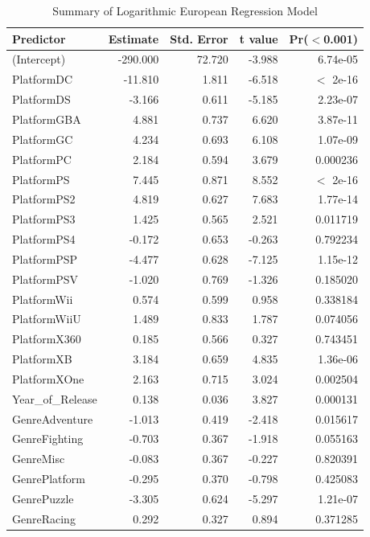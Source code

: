\documentclass[12pt]{article}
\begin{document}
\begin{table}[ht]
  \caption{Summary of Logarithmic European Regression Model}
  \label{tab:LogEU}
  \centering
  \begin{tabular}{lrrrr}
    \hline
    Predictor & Estimate & Std. Error & t value & Pr($<$0.001) \\
    \hline
    (Intercept) & -290.000 & 72.720 & -3.988 & 6.74e-05 \\
    PlatformDC & -11.810 & 1.811 & -6.518 & $<$ 2e-16 \\
    PlatformDS & -3.166 & 0.611 & -5.185 & 2.23e-07 \\
    PlatformGBA & 4.881 & 0.737 & 6.620 & 3.87e-11 \\
    PlatformGC & 4.234 & 0.693 & 6.108 & 1.07e-09 \\
    PlatformPC & 2.184 & 0.594 & 3.679 & 0.000236 \\
    PlatformPS & 7.445 & 0.871 & 8.552 & $<$ 2e-16 \\
    PlatformPS2 & 4.819 & 0.627 & 7.683 & 1.77e-14 \\
    PlatformPS3 & 1.425 & 0.565 & 2.521 & 0.011719 \\
    PlatformPS4 & -0.172 & 0.653 & -0.263 & 0.792234 \\
    PlatformPSP & -4.477 & 0.628 & -7.125 & 1.15e-12 \\
    PlatformPSV & -1.020 & 0.769 & -1.326 & 0.185020 \\
    PlatformWii & 0.574 & 0.599 & 0.958 & 0.338184 \\
    PlatformWiiU & 1.489 & 0.833 & 1.787 & 0.074056 \\
    PlatformX360 & 0.185 & 0.566 & 0.327 & 0.743451 \\
    PlatformXB & 3.184 & 0.659 & 4.835 & 1.36e-06 \\
    PlatformXOne & 2.163 & 0.715 & 3.024 & 0.002504 \\
    Year\_of\_Release & 0.138 & 0.036 & 3.827 & 0.000131 \\
    GenreAdventure & -1.013 & 0.419 & -2.418 & 0.015617 \\
    GenreFighting & -0.703 & 0.367 & -1.918 & 0.055163 \\
    GenreMisc & -0.083 & 0.367 & -0.227 & 0.820391 \\
    GenrePlatform & -0.295 & 0.370 & -0.798 & 0.425083 \\
    GenrePuzzle & -3.305 & 0.624 & -5.297 & 1.21e-07 \\
    GenreRacing & 0.292 & 0.327 & 0.894 & 0.371285 \\

\end{tabular}
\end{table}
\end{document}
